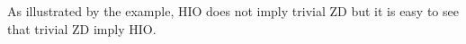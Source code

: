 As illustrated by the example, HIO does not imply trivial ZD but it is easy to 
see that trivial ZD imply HIO.
%



